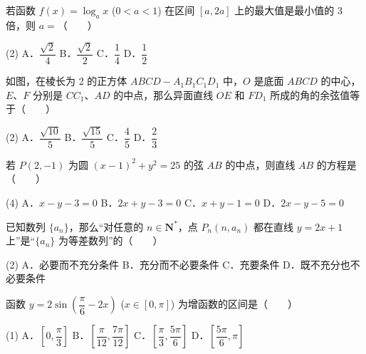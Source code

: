 \begin{question}
若函数 $f(x) = \log_a x$ ($0 < a < 1$) 在区间 $[a, 2a]$ 上的最大值是最小值的 3 倍，则 $a =$\mbox{（　　）}

\begin{gkopts}(2)
\task A．$\dfrac{\sqrt{2}}{4}$
\task B．$\dfrac{\sqrt{2}}{2}$
\task C．$\dfrac{1}{4}$
\task D．$\dfrac{1}{2}$
\end{gkopts}

\Needspace{0.4\textheight}
\end{question}
\begin{question}
如图，在棱长为 2 的正方体 $ABCD - A_1B_1C_1D_1$ 中，$O$ 是底面 $ABCD$ 的中心，$E$、$F$ 分别是 $CC_1$、$AD$ 的中点，那么异面直线 $OE$ 和 $FD_1$ 所成的角的余弦值等于\mbox{（　　）}
\nopagebreak[4]
\begin{center}\end{center}
\nopagebreak[4]
\begin{gkopts}(2)
\task A．$\dfrac{\sqrt{10}}{5}$
\task B．$\dfrac{\sqrt{15}}{5}$
\task C．$\dfrac{4}{5}$
\task D．$\dfrac{2}{3}$
\end{gkopts}

\end{question}
\begin{question}
若 $P(2, -1)$ 为圆 $(x - 1)^2 + y^2 = 25$ 的弦 $AB$ 的中点，则直线 $AB$ 的方程是\mbox{（　　）}

\begin{gkopts}(4)
\task A．$x - y - 3 = 0$
\task B．$2x + y - 3 = 0$
\task C．$x + y - 1 = 0$
\task D．$2x - y - 5 = 0$
\end{gkopts}

\end{question}
\begin{question}
已知数列 $\{a_n\}$，那么“对任意的 $n \in \mathbf{N}^*$，点 $P_n(n, a_n)$ 都在直线 $y = 2x + 1$ 上”是“$\{a_n\}$ 为等差数列”的\mbox{（　　）}

\begin{gkopts}(2)
\task A．必要而不充分条件
\task B．充分而不必要条件
\task C．充要条件
\task D．既不充分也不必要条件
\end{gkopts}

\end{question}
\begin{question}
函数 $y = 2\sin\left(\dfrac{\pi}{6} - 2x\right)$ ($x \in [0, \pi]$) 为增函数的区间是\mbox{（　　）}

\begin{gkopts}(1)
\task A．$\left[0, \dfrac{\pi}{3}\right]$
\task B．$\left[\dfrac{\pi}{12}, \dfrac{7\pi}{12}\right]$
\task C．$\left[\dfrac{\pi}{3}, \dfrac{5\pi}{6}\right]$
\task D．$\left[\dfrac{5\pi}{6}, \pi\right]$
\end{gkopts}

\Needspace{0.4\textheight}
\end{question}
